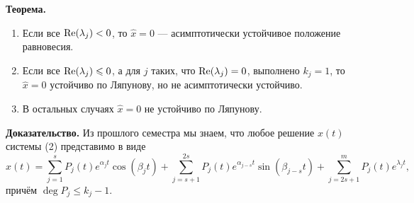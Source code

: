 \textbf{Теорема.} 
\begin{enumerate}
    \item Если все $\operatorname{Re}(\lambda_j) < 0$, то $\widehat{x} = 0$ --- асимптотически устойчивое положение равновесия.
    \item Если все $\operatorname{Re}(\lambda_j) \leqslant 0$, а для $j$ таких, что $\operatorname{Re}(\lambda_j) = 0$, выполнено $k_j = 1$, то $\widehat{x} = 0$ устойчиво по Ляпунову, но не асимптотически устойчиво.
    \item В остальных случаях $\widehat{x} = 0$ не устойчиво по Ляпунову.
\end{enumerate}

\textbf{Доказательство.} Из прошлого семестра мы знаем, что любое решение $x(t)$ системы (2) представимо в виде
\[
    x(t) = \sum_{j=1}^{s} P_j(t) e^{\alpha_j t}\cos(\beta_j t) + \sum_{j=s+1}^{2s} P_j(t) e^{\alpha_{j-s} t}\sin(\beta_{j-s} t) + \sum_{j=2s+1}^{m} P_j(t) e^{\lambda_j t},
\]
причём $\deg P_j \le k_j - 1$.

